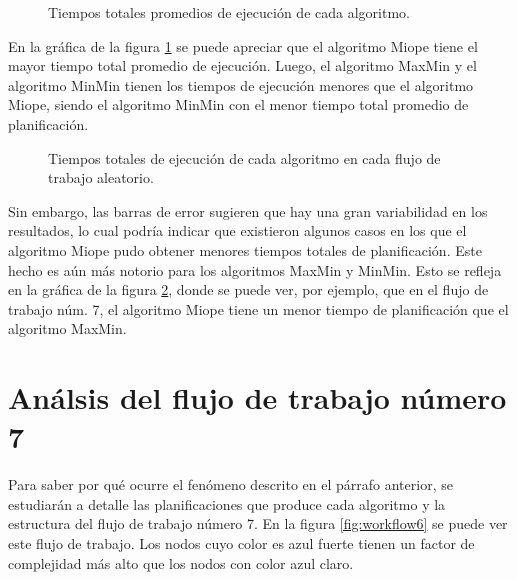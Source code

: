\begin{figure}
\begin{center}
\end{center}
\label{fig:tiempos_promedios}
\caption{Tiempos totales promedios de ejecución de cada algoritmo.}
\end{figure}

En la gráfica de la figura \ref{fig:tiempos_promedios} se puede apreciar que el algoritmo Miope tiene el mayor tiempo total promedio de ejecución. Luego, el algoritmo MaxMin y el algoritmo MinMin tienen los tiempos de ejecución menores que el algoritmo Miope, siendo el algoritmo MinMin con el menor tiempo total promedio de planificación.

\begin{figure}
\begin{center}
\end{center}
\label{fig:tiempos_totales}
\caption{Tiempos totales de ejecución de cada algoritmo en cada flujo de trabajo aleatorio.}
\end{figure}

Sin embargo, las barras de error sugieren que hay una gran variabilidad en los resultados, lo cual podría indicar que existieron algunos casos en los que el algoritmo Miope pudo obtener menores tiempos totales de planificación. Este hecho es aún más notorio para los algoritmos MaxMin y MinMin. Esto se refleja en la gráfica de la figura \ref{fig:tiempos_totales}, donde se puede ver, por ejemplo, que en el flujo de trabajo núm. 7, el algoritmo Miope tiene un menor tiempo de planificación que el algoritmo MaxMin.

\section{Análsis del flujo de trabajo número 7}
Para saber por qué ocurre el fenómeno descrito en el párrafo anterior, se estudiarán a detalle las planificaciones que produce cada algoritmo y la estructura del flujo de trabajo número 7. En la figura \ref{fig:workflow6} se puede ver este flujo de trabajo. Los nodos cuyo color es azul fuerte tienen un factor de complejidad más alto que los nodos con color azul claro.

